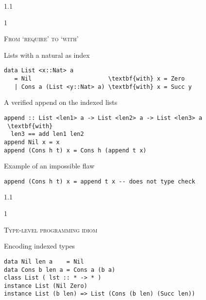 \documentclass{slides}
\newcommand{\header}[1]{{\large\scshape \color{Red} #1} \medskip }
\newcommand{\blau}[1]{{\color{Blue} #1} \medskip }
\newenvironment{myslide}{\begin{slide}\color{Blue}\begin{boxedminipage}{1.1\hsize}\begin{boxedminipage}{1\hsize}\color{Black}
\vspace{-170\in}
}{%
\smallskip
\end{boxedminipage}
\end{boxedminipage}
\end{slide}}
\begin{document}



\begin{myslide}

\header{From `require' to `with'}

\blau{Lists with a natural as index}

\begin{Verbatim}[fontseries=normal,fontsize=\tiny,commandchars=\\\{\}]
data List <x::Nat> a
   = Nil                      \textbf{with} x = Zero
   | Cons a (List <y::Nat> a) \textbf{with} x = Succ y
\end{Verbatim}

\blau{A verified append on the indexed lists}

\begin{Verbatim}[fontseries=normal,fontsize=\tiny,commandchars=\\\{\}]
append :: List <len1> a -> List <len2> a -> List <len3> a
 \textbf{with} 
  len3 == add len1 len2
append Nil x = x
append (Cons h t) x = Cons h (append t x)
\end{Verbatim}

\blau{Example of an impossible flaw}

\begin{Verbatim}[fontseries=normal,fontsize=\tiny,commandchars=\\\{\}]
append (Cons h t) x = append t x -- does not type check
\end{Verbatim}

\end{myslide}






\begin{myslide}

\header{Type-level programming idiom}

\blau{Encoding indexed types}

\medskip

\begin{Verbatim}[fontseries=normal,fontsize=\tiny]
data Nil len a    = Nil
data Cons b len a = Cons a (b a)
class List ( lst :: * -> * )
instance List (Nil Zero)
instance List (b len) => List (Cons (b len) (Succ len))
\end{Verbatim}

\end{myslide}
\end{document}
